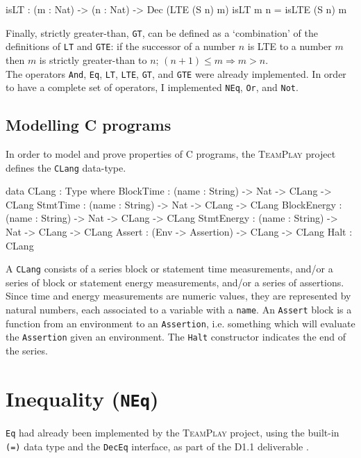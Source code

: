         \begin{code}[caption={\texttt{GT} can be defined based on \texttt{LTE}}]
        isLT : (m : Nat) -> (n : Nat) -> Dec (LTE (S n) m)
        isLT m n = isLTE (S n) m
        \end{code}
        
        Finally, strictly greater-than, \texttt{GT}, can be defined as a `combination' of the definitions of \texttt{LT} and \texttt{GTE}: if the successor of a number $n$ is LTE to a number $m$ then $m$ is strictly greater-than to $n$; $(n + 1) \leq m \Rightarrow m > n$.
        \\
        
        The operators \texttt{And}, \texttt{Eq}, \texttt{LT}, \texttt{LTE}, \texttt{GT}, and \texttt{GTE} were already implemented. In order to have a complete set of operators, I implemented \texttt{NEq}, \texttt{Or}, and \texttt{Not}.
        
    \subsection{Modelling C programs}
        In order to model and prove properties of C programs, the \textsc{TeamPlay} project defines the \texttt{CLang} data-type.
        \begin{code}[caption={The \texttt{CLang} data type}]
    data CLang : Type where
        BlockTime   : (name : String) -> Nat -> CLang -> CLang
        StmtTime    : (name : String) -> Nat -> CLang -> CLang
        BlockEnergy : (name : String) -> Nat -> CLang -> CLang
        StmtEnergy  : (name : String) -> Nat -> CLang -> CLang
        Assert      : (Env -> Assertion) -> CLang -> CLang
        Halt        : CLang
        \end{code}
        A \texttt{CLang} consists of a series block or statement time measurements, and/or a series of block or statement energy measurements, and/or a series of assertions. Since time and energy measurements are numeric values, they are represented by natural numbers, each associated to a variable with a \texttt{name}. An \texttt{Assert} block is a function from an environment to an \texttt{Assertion}, i.e. something which will evaluate the \texttt{Assertion} given an environment. The \texttt{Halt} constructor indicates the end of the series.
        
    \newpage


\section{Inequality (\texttt{NEq})}\label{des:neq}
    \texttt{Eq} had already been implemented by the \textsc{TeamPlay} project, using the built-in \texttt{(=)} data type and the \texttt{DecEq} interface, as part of the D1.1 deliverable \cite{teamplay:d1.1}.
    
